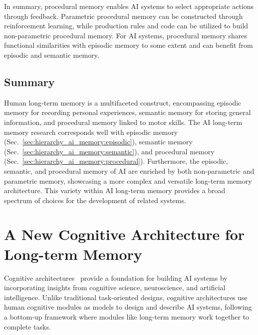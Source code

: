 \documentclass[journal,hideappendix]{vgtc}
\begin{document}
In summary, procedural memory enables AI systems to select appropriate actions through feedback. Parametric procedural memory can be constructed through reinforcement learning, while production rules and code can be utilized to build non-parametric procedural memory. 
For AI systems, procedural memory shares functional similarities with episodic memory to some extent and can benefit from episodic and semantic memory.

\subsection{Summary}

Human long-term memory is a multifaceted construct, encompassing episodic memory for recording personal experiences, semantic memory for storing general information, and procedural memory linked to motor skills. The AI long-term memory research corresponds well with episodic memory (Sec.~\ref{sec:hierarchy_ai_memory:episodic}), semantic memory (Sec.~\ref{sec:hierarchy_ai_memory:semantic}), and procedural memory (Sec.~\ref{sec:hierarchy_ai_memory:procedural}). Furthermore, the episodic, semantic, and procedural memory of AI are enriched by both non-parametric and parametric memory, showcasing a more complex and versatile long-term memory architecture. This variety within AI long-term memory provides a broad spectrum of choices for the development of related systems. 

\section{A New Cognitive Architecture for Long-term Memory}
\label{sec:hierarchy_ai_memory:cognitive_arc}

Cognitive architectures~\cite{samsonovich2010toward,laird2017standard,kotseruba202040} provide a foundation for building AI systems by incorporating insights from cognitive science, neuroscience, and artificial intelligence. Unlike traditional task-oriented designs, cognitive architectures use human cognitive modules as models to design and describe AI systems, following a bottom-up framework where modules like long-term memory work together to complete tasks. 
\end{document}
